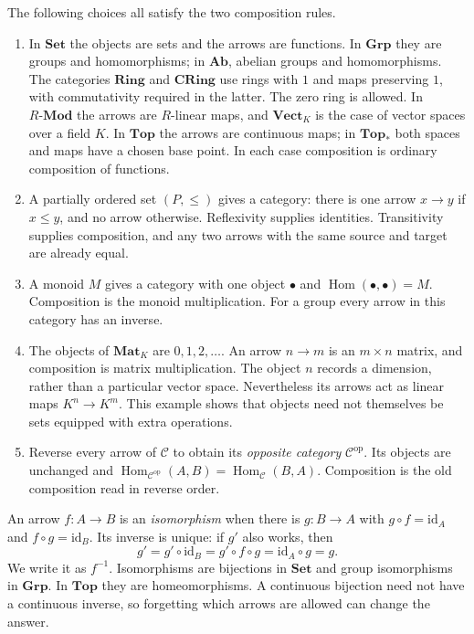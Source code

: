 \begin{example}\label{ex:categories}
The following choices all satisfy the two composition rules.
\begin{enumerate}[label=(\alph*)]
\item In $\mathbf{Set}$ the objects are sets and the arrows are functions. In $\mathbf{Grp}$ they are groups and homomorphisms; in $\mathbf{Ab}$, abelian groups and homomorphisms. The categories $\mathbf{Ring}$ and $\mathbf{CRing}$ use rings with $1$ and maps preserving $1$, with commutativity required in the latter. The zero ring is allowed. In $R\text{-}\mathbf{Mod}$ the arrows are $R$-linear maps, and $\mathbf{Vect}_K$ is the case of vector spaces over a field $K$. In $\mathbf{Top}$ the arrows are continuous maps; in $\mathbf{Top}_*$ both spaces and maps have a chosen base point. In each case composition is ordinary composition of functions.
\item A partially ordered set $(P,\le)$ gives a category: there is one arrow $x\to y$ if $x\le y$, and no arrow otherwise. Reflexivity supplies identities. Transitivity supplies composition, and any two arrows with the same source and target are already equal.
\item A monoid $M$ gives a category with one object $\bullet$ and $\operatorname{Hom}(\bullet,\bullet)=M$. Composition is the monoid multiplication. For a group every arrow in this category has an inverse.
\item The objects of $\mathbf{Mat}_K$ are $0,1,2,\ldots$. An arrow $n\to m$ is an $m\times n$ matrix, and composition is matrix multiplication. The object $n$ records a dimension, rather than a particular vector space. Nevertheless its arrows act as linear maps $K^n\to K^m$. This example shows that objects need not themselves be sets equipped with extra operations.
\item Reverse every arrow of $\mathcal C$ to obtain its \emph{opposite category} $\mathcal C^{\mathrm{op}}$. Its objects are unchanged and
$\operatorname{Hom}_{\mathcal C^{\mathrm{op}}}(A,B)=\operatorname{Hom}_{\mathcal C}(B,A)$.
Composition is the old composition read in reverse order.
\end{enumerate}
\end{example}

An arrow $f:A\to B$ is an \emph{isomorphism} when there is $g:B\to A$ with $g\circ f=\mathrm{id}_A$ and $f\circ g=\mathrm{id}_B$. Its inverse is unique: if $g'$ also works, then
\[
g'=g'\circ\mathrm{id}_B=g'\circ f\circ g=\mathrm{id}_A\circ g=g.
\]
We write it as $f^{-1}$. Isomorphisms are bijections in $\mathbf{Set}$ and group isomorphisms in $\mathbf{Grp}$. In $\mathbf{Top}$ they are homeomorphisms. A continuous bijection need not have a continuous inverse, so forgetting which arrows are allowed can change the answer.

